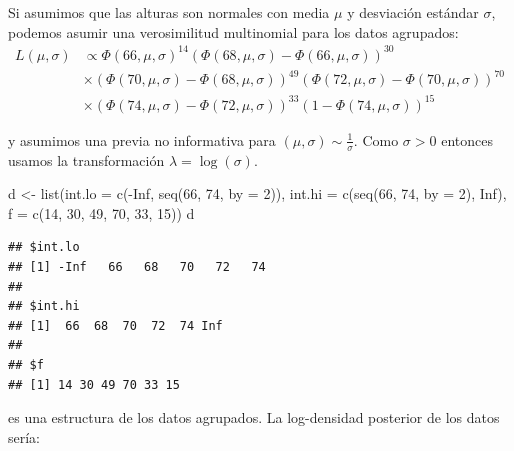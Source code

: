 \documentclass[
  12pt,
]{book}
\newenvironment{Shaded}{\begin{snugshade}}{\end{snugshade}}
\newcommand{\AttributeTok}[1]{\textcolor[rgb]{0.77,0.63,0.00}{#1}}
\newcommand{\ConstantTok}[1]{\textcolor[rgb]{0.00,0.00,0.00}{#1}}
\newcommand{\DecValTok}[1]{\textcolor[rgb]{0.00,0.00,0.81}{#1}}
\newcommand{\FunctionTok}[1]{\textcolor[rgb]{0.00,0.00,0.00}{#1}}
\newcommand{\NormalTok}[1]{#1}
\newcommand{\OtherTok}[1]{\textcolor[rgb]{0.56,0.35,0.01}{#1}}
\newcommand{\SpecialCharTok}[1]{\textcolor[rgb]{0.00,0.00,0.00}{#1}}
\theoremstyle{definition}
\theoremstyle{definition}
\theoremstyle{definition}
\theoremstyle{definition}
\theoremstyle{remark}
\begin{document}
Si asumimos que las alturas son normales con media \(\mu\) y desviación estándar \(\sigma\), podemos asumir una verosimilitud multinomial para los datos agrupados:
\begin{align*}
L(\mu,\sigma)&\propto \Phi(66,\mu,\sigma)^{14}(\Phi(68,\mu,\sigma)-\Phi(66,\mu,\sigma))^{30} \\
&\times  (\Phi(70,\mu,\sigma)-\Phi(68,\mu,\sigma))^{49} (\Phi(72,\mu,\sigma)-\Phi(70,\mu,\sigma))^{70}\\
&\times  (\Phi(74,\mu,\sigma)-\Phi(72,\mu,\sigma))^{33} (1-\Phi(74,\mu,\sigma))^{15}
\end{align*}

y asumimos una previa no informativa para \((\mu,\sigma)\sim \frac 1 \sigma\). Como \(\sigma>0\) entonces usamos la transformación \(\lambda=\log (\sigma)\).

\begin{Shaded}
\begin{Highlighting}[]
\NormalTok{d }\OtherTok{\textless{}{-}} \FunctionTok{list}\NormalTok{(}\AttributeTok{int.lo =} \FunctionTok{c}\NormalTok{(}\SpecialCharTok{{-}}\ConstantTok{Inf}\NormalTok{, }\FunctionTok{seq}\NormalTok{(}\DecValTok{66}\NormalTok{, }\DecValTok{74}\NormalTok{, }\AttributeTok{by =} \DecValTok{2}\NormalTok{)), }\AttributeTok{int.hi =} \FunctionTok{c}\NormalTok{(}\FunctionTok{seq}\NormalTok{(}\DecValTok{66}\NormalTok{,}
    \DecValTok{74}\NormalTok{, }\AttributeTok{by =} \DecValTok{2}\NormalTok{), }\ConstantTok{Inf}\NormalTok{), }\AttributeTok{f =} \FunctionTok{c}\NormalTok{(}\DecValTok{14}\NormalTok{, }\DecValTok{30}\NormalTok{, }\DecValTok{49}\NormalTok{, }\DecValTok{70}\NormalTok{, }\DecValTok{33}\NormalTok{, }\DecValTok{15}\NormalTok{))}
\NormalTok{d}
\end{Highlighting}
\end{Shaded}

\begin{verbatim}
## $int.lo
## [1] -Inf   66   68   70   72   74
## 
## $int.hi
## [1]  66  68  70  72  74 Inf
## 
## $f
## [1] 14 30 49 70 33 15
\end{verbatim}

es una estructura de los datos agrupados. La log-densidad posterior de los datos sería:
\end{document}
